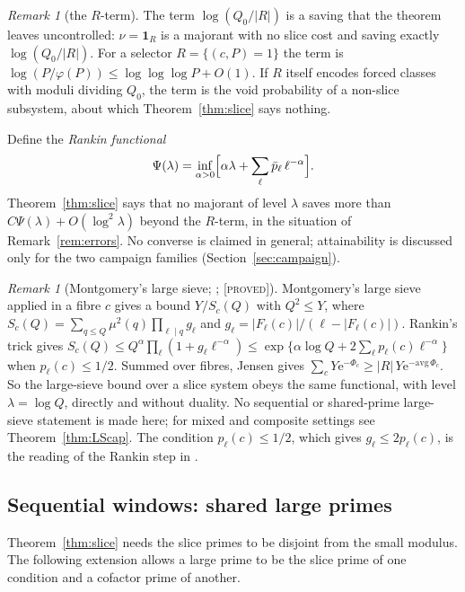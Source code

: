 \documentclass[10pt,reqno]{amsart}
\theoremstyle{definition}
\theoremstyle{remark}
\newtheorem{remark}[theorem]{Remark}
\newcommand{\ind}{\mathbf 1}
\newcommand{\e}{\mathrm e}
\newcommand{\lab}[1]{\textup{[\textsc{#1}]}}
\begin{document}
\begin{remark}[the $R$-term]\label{rem:Rterm}
The term $\log(Q_0/|R|)$ is a saving that the theorem leaves uncontrolled:
$\nu=\ind_R$ is a majorant with no slice cost and saving exactly
$\log(Q_0/|R|)$.  For a selector $R=\{(c,P)=1\}$ the term is
$\log(P/\varphi(P))\leq\log\log\log P+O(1)$.  If $R$ itself encodes forced
classes with moduli dividing $Q_0$, the term is the void probability of a
non-slice subsystem, about which Theorem~\ref{thm:slice} says nothing.
\end{remark}

Define the \emph{Rankin functional}
\begin{equation}\label{eq:rankin}
 \Psi(\lambda)=\inf_{\alpha>0}\Bigl[\alpha\lambda+\sum_\ell\bar p_\ell\,\ell^{-\alpha}\Bigr].
\end{equation}
Theorem~\ref{thm:slice} says that no majorant of level $\lambda$ saves more
than $C\Psi(\lambda)+O(\log^2\lambda)$ beyond the $R$-term, in the
situation of Remark~\ref{rem:errors}.  No converse is claimed in
general; attainability is discussed only for the two campaign families
(Section~\ref{sec:campaign}).

\begin{remark}[Montgomery's large sieve; {\cite[Remark~2.6]{ET}}; \lab{proved}]\label{rem:LS}
Montgomery's large sieve \cite{Montgomery} applied in a fibre $c$ gives a
bound $Y/S_c(Q)$ with $Q^2\leq Y$, where
$S_c(Q)=\sum_{q\leq Q}\mu^2(q)\prod_{\ell\mid q}g_\ell$ and
$g_\ell=|F_\ell(c)|/(\ell-|F_\ell(c)|)$.  Rankin's trick gives
$S_c(Q)\leq Q^\alpha\prod_\ell(1+g_\ell\ell^{-\alpha})
\leq\exp\{\alpha\log Q+2\sum_\ell p_\ell(c)\ell^{-\alpha}\}$ when
$p_\ell(c)\leq1/2$.  Summed over fibres, Jensen gives
$\sum_cY\e^{-\Phi_c}\geq|R|\,Y\e^{-\mathrm{avg}\,\Phi_c}$.  So the large-sieve
bound over a slice system obeys the same functional, with level
$\lambda=\log Q$, directly and without duality.  No sequential or
shared-prime large-sieve statement is made here; for mixed and composite
settings see Theorem~\ref{thm:LScap}.  The condition
$p_\ell(c)\leq1/2$, which gives $g_\ell\leq2p_\ell(c)$, is the reading of
the Rankin step in \cite[item~3.4]{ETrev}.
\end{remark}

\subsection{Sequential windows: shared large primes}\label{sec:seq}
Theorem~\ref{thm:slice} needs the slice primes to be disjoint from the
small modulus.  The following extension allows a large prime to be the
slice prime of one condition and a cofactor prime of another.
\end{document}
